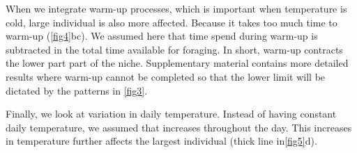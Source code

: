 When we integrate warm-up processes, which is important when temperature is cold, large individual is also more affected.
Because it takes too much time to warm-up (\cref{fig4}bc).
We assumed here that time spend during warm-up is subtracted in the total time available for foraging.
In short, warm-up contracts the lower part part of the niche.
Supplementary material contains more detailed results where warm-up cannot be completed so that the lower limit will be dictated by the patterns in \cref{fig3}.

Finally, we look at variation in daily temperature.
Instead of having constant daily temperature, we assumed that increases throughout the day.
This increases in temperature further affects the largest individual (thick line in\cref{fig5}d).

%
%
%
